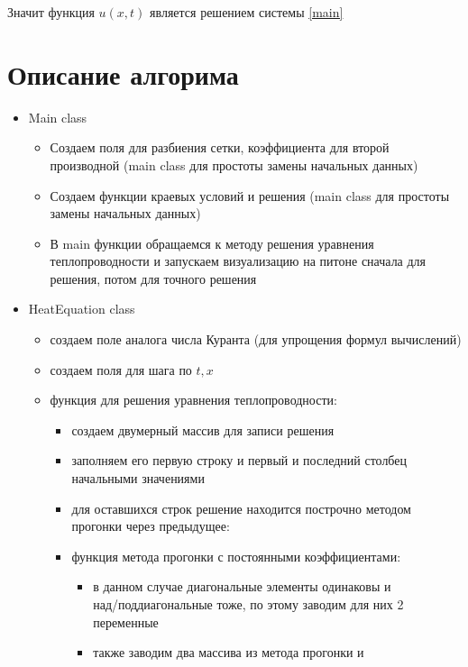 \documentclass[12pt,a4paper]{scrartcl}
\begin{document}
Значит функция $u(x,t)$ является решением системы \eqref{main}

\section{Описание алгорима}
\begin{itemize}
    \item Main class 
    \begin{itemize}
        \item Создаем поля для разбиения сетки, коэффициента для
        второй производной (main class для простоты замены начальных
        данных)
        \item Создаем функции краевых условий и решения (main class
        для простоты замены начальных данных)
        \item В main функции обращаемся к методу решения уравнения
        теплопроводности и запускаем визуализацию на питоне сначала
        для
        решения, потом для точного решения
    \end{itemize}
    \item HeatEquation class
    \begin{itemize}
        \item создаем поле аналога числа Куранта (для упрощения
        формул
        вычислений)
        \item создаем поля для шага по $t,x$  
        \item функция для решения уравнения теплопроводности:
        \begin{itemize}
            \item создаем двумерный массив для записи решения 
            \item заполняем его первую строку и первый и последний 
            столбец начальными значениями
            \item для оставшихся строк решение находится построчно 
            методом прогонки через предыдущее:
            \item функция метода прогонки с постоянными
            коэффициентами:
            \begin{itemize}
                \item в данном случае диагональные элементы одинаковы
                и \\
                над/поддиагональные тоже, по этому заводим для них
                2 переменные
                \item также заводим два массива из метода прогонки и 

\end{itemize}
\end{itemize}
\end{itemize}
\end{itemize}
\end{document}
